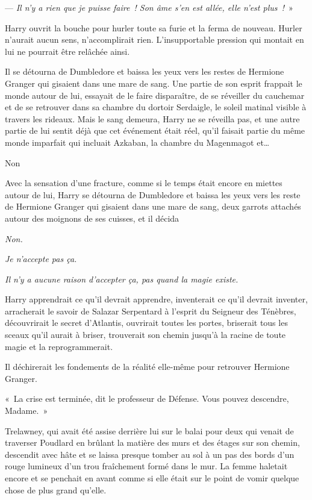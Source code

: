 --- \emph{Il n'y a rien que je puisse faire~!
Son âme s'en est allée, elle n'est plus~!}~»

Harry ouvrit la bouche pour hurler toute sa furie et la ferma de nouveau.
Hurler n'aurait aucun sens, n'accomplirait rien.
L'insupportable pression qui montait en lui ne pourrait être relâchée ainsi.

Il se détourna de Dumbledore et baissa les yeux vers les restes de Hermione Granger qui gisaient dans une mare de sang.
Une partie de son esprit frappait le monde autour de lui, essayait de le faire disparaître, de se réveiller du cauchemar et de se retrouver dans sa chambre du dortoir Serdaigle, le soleil matinal visible à travers les rideaux.
Mais le sang demeura, Harry ne se réveilla pas, et une autre partie de lui sentit déjà que cet événement était réel, qu'il faisait partie du même monde imparfait qui incluait Azkaban, la chambre du Magenmagot et…

Non

Avec la sensation d'une fracture, comme si le temps était encore en miettes autour de lui, Harry se détourna de Dumbledore et baissa les yeux vers les reste de Hermione Granger qui gisaient dans une mare de sang, deux garrots attachés autour des moignons de ses cuisses, et il décida

\emph{Non.}

\emph{Je n'accepte pas ça.}

\emph{Il n'y a aucune raison d'accepter ça, pas quand la magie existe.}

Harry apprendrait ce qu'il devrait apprendre, inventerait ce qu'il devrait inventer, arracherait le savoir de Salazar Serpentard à l'esprit du Seigneur des Ténèbres, découvrirait le secret d'Atlantis, ouvrirait toutes les portes, briserait tous les sceaux qu'il aurait à briser, trouverait son chemin jusqu'à la racine de toute magie et la reprogrammerait.

Il déchirerait les fondements de la réalité elle-même pour retrouver Hermione Granger.

\later

«~La crise est terminée, dit le professeur de Défense.
Vous pouvez descendre, Madame.~»

Trelawney, qui avait été assise derrière lui sur le balai pour deux qui venait de traverser Poudlard en brûlant la matière des murs et des étages sur son chemin, descendit avec hâte et se laissa presque tomber au sol à un pas des bords d'un rouge lumineux d'un trou fraîchement formé dans le mur.
La femme haletait encore et se penchait en avant comme si elle était sur le point de vomir quelque chose de plus grand qu'elle.

